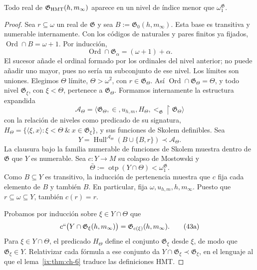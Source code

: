 \begin{lemma}
\label{ix:thm:ch-8}
Todo real de
\(\mathfrak G_{\rm HMT}(h,m_\infty)\) aparece en un nivel de índice menor que
\(\omega_1^{\mathfrak G}\).

\end{lemma}
\begin{proof}
Sea \(r\subseteq\omega\) un real de \(\mathfrak G\) y sea
\(B:=\mathfrak G_0(h,m_\infty)\). Esta base es transitiva y numerable
internamente. Con los códigos de naturales y pares finitos ya fijados,
\(\operatorname{Ord}\cap B=\omega+1\). Por inducción,
\[
 \operatorname{Ord}\cap\mathfrak G_\alpha=(\omega+1)+\alpha.
\]
El sucesor añade el ordinal formado por los ordinales del nivel anterior;
no puede añadir uno mayor, pues no sería un subconjunto de ese nivel. Los
límites son uniones. Elegimos \(\Theta\) límite, \(\Theta>\omega^2\),
con \(r\in\mathfrak G_\Theta\). Así
\(\operatorname{Ord}\cap\mathfrak G_\Theta=\Theta\), y todo nivel
\(\mathfrak G_\xi\), con \(\xi<\Theta\), pertenece a
\(\mathfrak G_\Theta\). Formamos internamente la estructura expandida
\[
 \mathcal A_\Theta=
 \langle\mathfrak G_\Theta,\in,u_{h,m},
         H_\Theta,<_{\mathfrak G}\!\upharpoonright\mathfrak G_\Theta\rangle
\]
con la relación de niveles como predicado de su signatura,
\(H_\Theta=\{\langle\xi,x\rangle:\xi<\Theta\ \&\
x\in\mathfrak G_\xi\}\), y sus funciones de Skolem definibles. Sea
\[
 Y=\operatorname{Hull}^{\mathcal A_\Theta}
   (B\cup\{B,r\})\prec\mathcal A_\Theta .
\]
La clausura bajo la familia numerable de funciones de Skolem muestra dentro
de \(\mathfrak G\) que \(Y\) es numerable. Sea
\(c:Y\rightarrow M\) su colapso de Mostowski y
\[
 \bar\Theta:=\operatorname{otp}(Y\cap\Theta)
 <\omega_1^{\mathfrak G}.
\]
Como \(B\subseteq Y\) es transitivo, la inducción de pertenencia muestra
que \(c\) fija cada elemento de \(B\) y también \(B\). En particular,
fija \(\omega,u_{h,m},h,m_\infty\). Puesto que
\(r\subseteq\omega\subseteq Y\), también \(c(r)=r\).

Probamos por inducción sobre \(\xi\in Y\cap\Theta\) que
\[
 c``\bigl(Y\cap\mathfrak G_\xi(h,m_\infty)\bigr)
 =\mathfrak G_{c(\xi)}(h,m_\infty).
\tag{43a}\label{ix:eq:ch-condensacion}
\]
Para \(\xi\in Y\cap\Theta\), el predicado \(H_\Theta\) define el
conjunto \(\mathfrak G_\xi\) desde \(\xi\), de modo que
\(\mathfrak G_\xi\in Y\). Relativizar cada fórmula a ese conjunto da
\(Y\cap\mathfrak G_\xi\prec\mathfrak G_\xi\), en el lenguaje al que
el lema~\ref{ix:thm:ch-6} traduce las definiciones HMT.


\end{proof}
